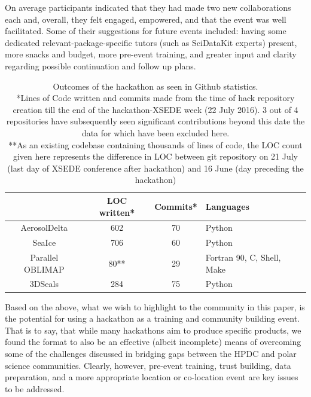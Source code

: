 \documentclass[conference]{IEEEtran}
\begin{document}
On average participants indicated that they had made two new collaborations each and, overall, they felt engaged, empowered, and that the event was well facilitated.  Some of their suggestions for future events included: having some dedicated relevant-package-specific tutors (such as SciDataKit experts) present, more snacks and budget, more pre-event training, and greater input and clarity regarding possible continuation and follow up plans.


\begin{table}[!t]
\centering
\renewcommand{\arraystretch}{1.3}
\label{stats}
\centering
\begin{tabular}{|c|c|c|p{2cm}|}
\hline
&LOC written* & Commits* & Languages\\
\hline
AerosolDelta & 602 & 70 & Python\\
\hline
SeaIce & 706 & 60 & Python\\
\hline
Parallel OBLIMAP & 80** & 29 & Fortran 90, C, Shell, Make\\
\hline
3DSeals & 284 & 75 & Python\\
\hline
\end{tabular}
\caption{\footnotesize {Outcomes of the hackathon as seen in Github statistics. \\
*Lines of Code written and commits made from the time of hack repository creation till the end of the hackathon-XSEDE week (22 July 2016).  3 out of 4 repositories have subsequently seen significant contributions beyond this date the data for which have been excluded here.\\
**As an existing codebase containing thousands of lines of code, the LOC count given here represents the difference in LOC between git repository on 21 July (last day of XSEDE conference after hackathon) and 16 June (day preceding the hackathon)}}
\end{table}

Based on the above, what we wish to highlight to the community in this paper, is the potential for using a hackathon as a training and community building event. That is to say, that while many hackathons aim to produce specific products, we found the format to also be an effective (albeit incomplete) means of overcoming some of the challenges discussed in bridging gaps between the HPDC and polar science communities. Clearly, however, pre-event training, trust building, data preparation, and a more appropriate location or co-location event are key issues to be addressed. 
\end{document}
